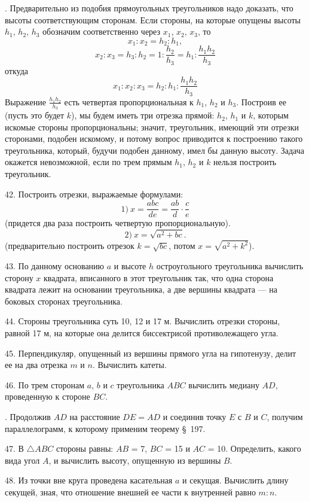 \documentclass[oneside]{book}
\begin{document}
.
Предварительно из подобия прямоугольных треугольников надо доказать, что высоты  соответствующим сторонам.
Если стороны, на которые опущены высоты $h_1$, $h_2$, $h_3$ обозначим соответственно через $x_1$, $x_2$, $x_3$, то
\[x_1:x_2=h_2:h_1,\]
\[x_2:x_3=h_3:h_2=1:\frac{h_2}{h_3}=h_1:\frac{h_1h_2}{h_3}\]
откуда 
\[x_1:x_2:x_3=h_2:h_1:\frac{h_1h_2}{h_3}\]
Выражение $\frac{h_1h_2}{h_3}$ есть четвертая пропорциональная к $h_1$, $h_2$ и $h_3$.
Построив ее (пусть это будет $k$), мы будем иметь три отрезка прямой:
$h_2$, $h_1$ и $k$, которым искомые стороны пропорциональны;
значит, треугольник, имеющий эти отрезки сторонами, подобен искомому, и потому вопрос приводится к построению такого треугольника, который, будучи подобен данному, имел бы данную высоту.
Задача окажется невозможной, если по трем прямым $h_1$, $h_2$ и $k$ нельзя построить треугольник.

42.
Построить отрезки, выражаемые формулами:
\[1)\ x=\frac{abc}{de}=\frac{ab}{d}\cdot \frac{c}{e}\]
(придется два раза построить четвертую пропорциональную).
\[2)\ x=\sqrt{a^2+bc}.\]
(предварительно построить отрезок $k=\sqrt{bc}$, потом $x=\sqrt{a^2+k^2}$).


43.
По данному основанию $a$ и высоте $h$ остроугольного треугольника вычислить сторону $x$ квадрата, вписанного в этот треугольник так, что одна сторона квадрата лежит на основании треугольника, а две вершины квадрата — на боковых сторонах треугольника.

44.
Стороны треугольника суть 10, 12 и 17 м.
Вычислить отрезки стороны, равной 17 м, на которые она делится биссектрисой противолежащего угла.

45.
Перпендикуляр, опущенный из вершины прямого угла на гипотенузу, делит ее на два отрезка $m$ и $n$.
Вычислить катеты.

46.
По трем сторонам $a$, $b$ и $c$ треугольника $ABC$ вычислить медиану $AD$, проведенную к стороне $BC$.

.
Продолжив $AD$ на расстояние $DE=AD$ и соединив точку $E$ с $B$ и $C$, получим параллелограмм, к которому применим теорему §~197.

47.
В $\triangle ABC$ стороны равны:
$AB$ = 7, $BC$ = 15 и $AC$ = 10.
Определить, какого вида угол $A$, и вычислить высоту, опущенную из вершины $B$.

48.
Из точки вне круга проведена касательная $a$ и секущая.
Вычислить длину секущей, зная, что отношение внешней ее части к внутренней равно $m:n$.
\end{document}
